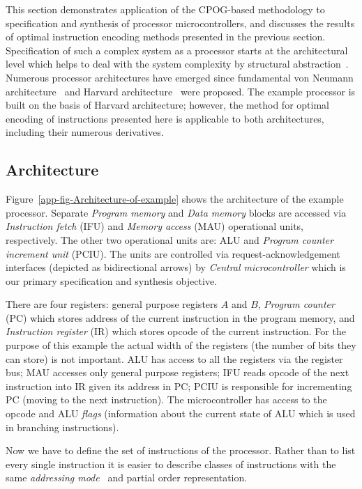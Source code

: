 This section demonstrates application of the CPOG-based methodology
to specification and synthesis of processor microcontrollers, and
discusses the results of optimal instruction encoding methods presented
in the previous section. Specification of such a complex system as
a processor starts at the architectural level which helps to deal
with the system complexity by structural abstraction~\cite{1994_de_micheli_book}.
Numerous processor architectures have emerged since fundamental von
Neumann architecture\emph{~}\cite{1946_burks_architecture} and Harvard
architecture\emph{~}\cite{1946_aiken_calculator} were proposed.
The example processor is built on the basis of Harvard architecture;
however, the method for optimal encoding of instructions presented
here is applicable to both architectures, including their
numerous derivatives.


\subsection{Architecture}

Figure~\ref{app-fig-Architecture-of-example} shows the architecture
of the example processor. Separate \emph{Program memory} and \emph{Data
memory} blocks are accessed via \emph{Instruction fetch} (IFU) and
\emph{Memory access} (MAU) operational units, respectively. The
other two operational units are: ALU and \emph{Program counter increment
unit} (PCIU). The units are controlled via request-acknowledgement
interfaces (depicted as bidirectional arrows) by \emph{Central microcontroller}
which is our primary specification and synthesis objective. 

There are four registers: general purpose registers $A$ and $B$,
\emph{Program counter} (PC) which stores address of the current
instruction in the program memory, and \emph{Instruction register}
(IR) which stores opcode of the current instruction. For the purpose
of this example the actual width of the registers (the number of bits
they can store) is not important. ALU has access to all the registers
via the register bus; MAU accesses only general purpose registers;
IFU reads opcode of the next instruction into IR given its address
in PC; PCIU is responsible for incrementing PC (moving to the next
instruction). The microcontroller has access to the opcode and ALU
\emph{flags} (information about the current state of ALU which is
used in branching instructions).


Now we have to define the set of instructions of the processor. Rather
than to list every single instruction it is easier to describe classes
of instructions with the same \emph{addressing mode}~\cite{mspmanual}
and partial order representation.

